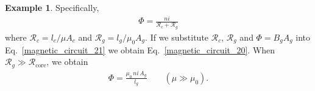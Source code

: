 \documentclass[11pt,a4paper,oneside]{book}
\numberwithin{equation}{section}
\theoremstyle{it}
\theoremstyle{definition}
\newtheorem{example}{Example}[section]
\begin{document}
\begin{example}
Specifically,
	\begin{equation}\label{magnetic_circuit_21}
	{\begin{aligned}
			\Phi=\frac{ni}{\mathscr{R}_c+\mathscr{R}_g}
	\end{aligned}}
	\end{equation}
where $\mathscr{R}_c=l_c/\mu A_c$ and $\mathscr{R}_g=l_g/\mu_0 A_g$. If we substitute $\mathscr{R}_c$, $\mathscr{R}_g$ and $\Phi=B_gA_g$ into Eq.~\eqref{magnetic_circuit_21} we obtain Eq.~\eqref{magnetic_circuit_20}. When $\mathscr{R}_g\gg\mathscr{R}_\text{core}$, we obtain
	\begin{equation}\label{magnetic_circuit_22}
	{\begin{aligned}
			\Phi=\frac{\mu_0\,ni\,A_g}{l_g}\qquad(\mu\gg\mu_0).
	\end{aligned}}
	\end{equation}


\end{example}
\end{document}
